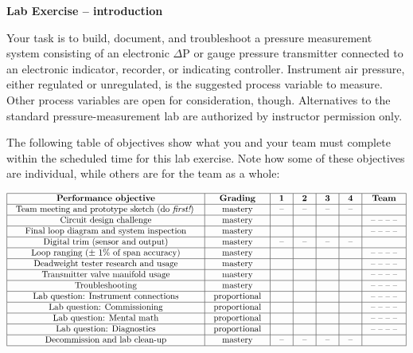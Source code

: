 

\noindent
{\bf Lab Exercise -- introduction}

\vskip 5pt

Your task is to build, document, and troubleshoot a pressure measurement system consisting of an electronic $\Delta$P or gauge pressure transmitter connected to an electronic indicator, recorder, or indicating controller.  Instrument air pressure, either regulated or unregulated, is the suggested process variable to measure.  Other process variables are open for consideration, though.  Alternatives to the standard pressure-measurement lab are authorized by instructor permission only.

The following table of objectives show what you and your team must complete within the scheduled time for this lab exercise.  Note how some of these objectives are individual, while others are for the team as a whole:



$$\vbox{\offinterlineskip
\halign{\strut
\vrule \quad\hfil # \ \hfil & 
\vrule \quad\hfil # \ \hfil & 
\vrule \quad\hfil # \ \hfil & 
\vrule \quad\hfil # \ \hfil & 
\vrule \quad\hfil # \ \hfil & 
\vrule \quad\hfil # \ \hfil & 
\vrule \quad\hfil # \ \hfil \vrule \cr
\noalign{\hrule}
%
{\bf Performance objective} & {\bf Grading} & {\bf 1} & {\bf 2} & {\bf 3} & {\bf 4} & {\bf Team} \cr
%
\noalign{\hrule}
%
Team meeting and prototype sketch (do {\it first!}) & mastery & -- & -- & -- & -- & \cr
%
\noalign{\hrule}
%
Circuit design challenge & mastery & & & & & -- -- -- -- \cr
%
\noalign{\hrule}
%
Final loop diagram and system inspection & mastery & & & & & -- -- -- -- \cr
%
\noalign{\hrule}
%
Digital trim (sensor and output) & mastery & -- & -- & -- & -- &  \cr
%
\noalign{\hrule}
%
Loop ranging ($\pm$ 1\% of span accuracy) & mastery & & & & & -- -- -- -- \cr
%
\noalign{\hrule}
%
Deadweight tester research and usage & mastery & & & & & -- -- -- -- \cr
%
\noalign{\hrule}
%
Transmitter valve manifold usage & mastery & & & & & -- -- -- -- \cr
%
\noalign{\hrule}
%
Troubleshooting & mastery & & & & & -- -- -- -- \cr
%
\noalign{\hrule}
%
Lab question: Instrument connections & proportional &  &  &  &  & -- -- -- -- \cr
%
\noalign{\hrule}
%
Lab question: Commissioning & proportional &  &  &  &  & -- -- -- -- \cr
%
\noalign{\hrule}
%
Lab question: Mental math & proportional &  &  &  &  & -- -- -- -- \cr
%
\noalign{\hrule}
%
Lab question: Diagnostics & proportional &  &  &  &  & -- -- -- -- \cr
%
\noalign{\hrule}
%
Decommission and lab clean-up & mastery & -- & -- & -- & -- &  \cr
%
\noalign{\hrule}
} %
}$$ %

